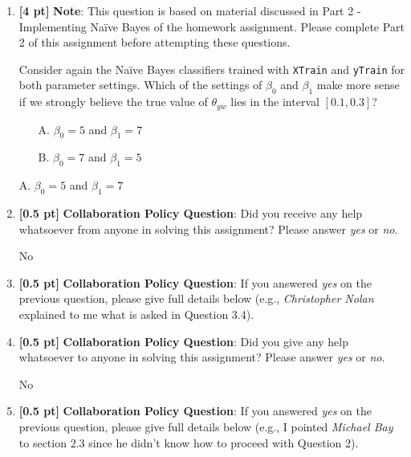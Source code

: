 \documentclass{article}
\begin{document}
\begin{enumerate}
    \item \textbf{[4 pt]} \textbf{Note}: This question is based on material discussed in Part 2 - Implementing Na{\"i}ve Bayes of the homework assignment. Please complete Part 2 of this assignment before attempting these questions.
    
    Consider again the Na{\"i}ve Bayes classifiers trained with \texttt{XTrain} and \texttt{yTrain} for both parameter settings. Which of the settings of $\beta_0$ and $\beta_1$ make more sense if we strongly believe the true value of $\theta_{yw}$ lies in the interval $[0.1, 0.3]$?
    \begin{itemize}
        \item[A.] $\beta_0=5$ and $\beta_1=7$
        \item[B.] $\beta_0=7$ and $\beta_1=5$
    \end{itemize}
    
    \begin{tcolorbox}[width=\linewidth/3,height=1.5cm]
    A. $\beta_0=5$ and $\beta_1=7$
    \end{tcolorbox}
    
    \item \textbf{[0.5 pt]} \textbf{Collaboration Policy Question}: Did you receive any help whatsoever from anyone in solving this assignment? Please answer \textit{yes} or \textit{no}.
    \begin{tcolorbox}[width=\linewidth/3,height=1.5cm]
    No
    \end{tcolorbox}
    
    \item \textbf{[0.5 pt]} \textbf{Collaboration Policy Question}: If you answered \textit{yes} on the previous question, please give full details below (e.g., \textit{Christopher Nolan} explained to me what is asked in Question 3.4).
    \begin{tcolorbox}[height=1.5cm]
    \end{tcolorbox}
    
    \item \textbf{[0.5 pt]} \textbf{Collaboration Policy Question}: Did you give any help whatsoever to anyone in solving this assignment? Please answer \textit{yes} or \textit{no}.
    \begin{tcolorbox}[width=\linewidth/3,height=1.5cm]
    No
    \end{tcolorbox}
    \newpage
    \item \textbf{[0.5 pt]} \textbf{Collaboration Policy Question}: If you answered \textit{yes} on the previous question, please give full details below (e.g., I pointed \textit{Michael Bay} to section 2.3 since he didn't know how to proceed with Question 2).
    \begin{tcolorbox}[height=1.5cm]
    \end{tcolorbox}
    


\end{enumerate}
\end{document}
